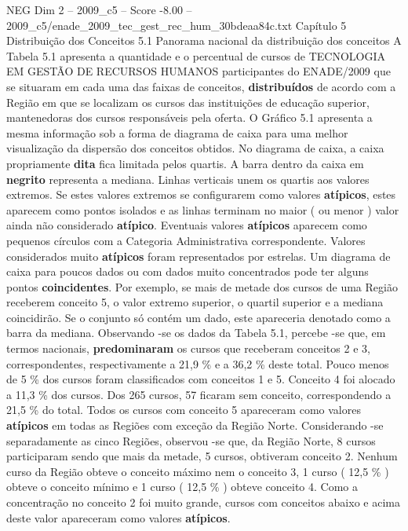 \begin{textsample}{NEG Dim 2 – 2009\_c5 – Score -8.00 – 2009\_c5/enade\_2009\_tec\_gest\_rec\_hum\_30bdeaa84c.txt}  \label{ex:f2_neg_020}
Capítulo 5 Distribuição dos Conceitos 5.1 Panorama nacional da distribuição dos conceitos A Tabela 5.1 apresenta a quantidade e o percentual de cursos de TECNOLOGIA EM GESTÃO DE RECURSOS HUMANOS participantes do ENADE/2009 que se situaram em cada uma das faixas de conceitos, \textbf{distribuídos} de acordo com a Região em que se localizam os cursos das instituições de educação superior, mantenedoras dos cursos responsáveis pela oferta.
O Gráfico 5.1 apresenta a mesma informação sob a forma de diagrama de caixa para uma melhor visualização da dispersão dos conceitos obtidos.
No diagrama de caixa, a caixa propriamente \textbf{dita} fica limitada pelos quartis.
A barra dentro da caixa em \textbf{negrito} representa a mediana.
Linhas verticais unem os quartis aos valores extremos.
Se estes valores extremos se configurarem como valores \textbf{atípicos}, estes aparecem como pontos isolados e as linhas terminam no maior ( ou menor ) valor ainda não considerado \textbf{atípico}.
Eventuais valores \textbf{atípicos} aparecem como pequenos círculos com a Categoria Administrativa correspondente.
Valores considerados muito \textbf{atípicos} foram representados por estrelas.
Um diagrama de caixa para poucos dados ou com dados muito concentrados pode ter alguns pontos \textbf{coincidentes}.
Por exemplo, se mais de metade dos cursos de uma Região receberem conceito 5, o valor extremo superior, o quartil superior e a mediana coincidirão.
Se o conjunto só contém um dado, este apareceria denotado como a barra da mediana.
Observando -se os dados da Tabela 5.1, percebe -se que, em termos nacionais, \textbf{predominaram} os cursos que receberam conceitos 2 e 3, correspondentes, respectivamente a 21,9 \% e a 36,2 \% deste total.
Pouco menos de 5 \% dos cursos foram classificados com conceitos 1 e 5.
Conceito 4 foi alocado a 11,3 \% dos cursos.
Dos 265 cursos, 57 ficaram sem conceito, correspondendo a 21,5 \% do total.
Todos os cursos com conceito 5 apareceram como valores \textbf{atípicos} em todas as Regiões com exceção da Região Norte.
Considerando -se separadamente as cinco Regiões, observou -se que, da Região Norte, 8 cursos participaram sendo que mais da metade, 5 cursos, obtiveram conceito 2.
Nenhum curso da Região obteve o conceito máximo nem o conceito 3, 1 curso ( 12,5 \% ) obteve o conceito mínimo e 1 curso ( 12,5 \% ) obteve conceito 4.
Como a concentração no conceito 2 foi muito grande, cursos com conceitos abaixo e acima deste valor apareceram como valores \textbf{atípicos}.

\end{textsample}
